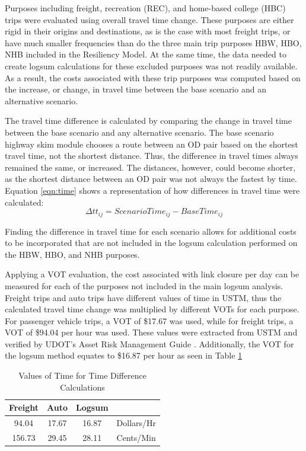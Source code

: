 Purposes including freight, recreation (REC), and home-based college
(HBC) trips were evaluated using overall travel time change. These
purposes are either rigid in their origins and destinations, as is the
case with most freight trips, or have much smaller frequencies than do the
three main trip purposes HBW, HBO, NHB included in the Resiliency
Model. At the same time, the data needed to create logsum calculations for these
excluded purposes was not readily available. As a result, the costs associated with these trip
purposes was computed based on the increase, or change, in travel time between the base
scenario and an alternative scenario.

The travel time difference is calculated by comparing the change in travel
time between the base scenario and any alternative scenario. The base
scenario highway skim module chooses a route between an OD pair based on
the shortest travel time, not the shortest distance. Thus, the difference
in travel times always remained the same, or increased. The distances, however,
could become shorter, as the shortest distance between an OD pair was not
always the fastest by time. Equation \ref{eqn:time} shows a representation of how
differences in travel time were calculated:
\begin{equation}
	\Delta tt_{ij} = ScenarioTime_{ij} - BaseTime_{ij}
	\label{eqn:time}
\end{equation}

Finding the difference in travel time for each scenario allows for
additional costs to be incorporated that are not included in the logsum
calculation performed on the HBW, HBO, and NHB purposes.

Applying a VOT evaluation, the cost associated with link
closure per day can be measured for each of the purposes not included in
the main logsum analysis. Freight trips and auto trips have different
values of time in USTM, thus the calculated travel time change was
multiplied by different VOTs for each purpose. For passenger vehicle
trips, a VOT of \$17.67 was used, while for freight trips, a VOT of
\$94.04 per hour was used. These values were extracted from USTM and
verified by UDOT's Asset Risk Management Guide \citep{UtahDepartmentofTransportation2020}.
Additionally, the VOT for the logsum method equates to \$16.87 per hour as seen in
Table \ref{tab:VOT}

\begin{table}


\caption{\label{tab:VOT}Values of Time for Time Difference Calculations}
\centering
\begin{tabular}[t]{cccl}
\toprule
Freight & Auto & Logsum\\
\midrule
94.04 & 17.67 & 16.87 & Dollars/Hr\\
156.73 & 29.45 & 28.11 & Cents/Min\\
\bottomrule
\end{tabular}
\end{table}

